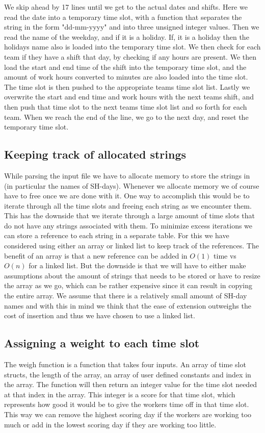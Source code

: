 We skip ahead by 17 lines until we get to the actual dates and shifts. Here we read the date into a temporary time slot, with a function that separates the string in the form "dd-mm-yyyy" and into three unsigned integer values. Then we read the name of the weekday, and if it is a holiday. If, it is a holiday then the holidays name also is loaded into the temporary time slot. We then check for each team if they have a shift that day, by checking if any hours are present. We then load the start and end time of the shift into the temporary time slot, and the amount of work hours converted to minutes are also loaded into the time slot. The time slot is then pushed to the appropriate teams time slot list. Lastly we overwrite the start and end time and work hours with the next teams shift, and then push that time slot to the next teams time slot list and so forth for each team. When we reach the end of the line, we go to the next day, and reset the temporary time slot. 

\subsection{Keeping track of allocated strings}
While parsing the input file we have to allocate memory to store the strings in (in particular the names of SH-days). Whenever we allocate memory we of course have to free once we are done with it. One way to accomplish this would be to iterate through all the time slots and freeing each string as we encounter them. This has the downside that we iterate through a large amount of time slots that do not have any strings associated with them. To minimize excess iterations we can store a reference to each string in a separate table. For this we have considered using either an  array or linked list to keep track of the references. The benefit of an array is that a new reference can be added in $O(1)$ time vs $O(n)$ for a linked list. But the downside is that we will have to either make assumptions about the amount of strings that needs to be stored or have to resize the array as we go, which can be rather expensive since it can result in copying the entire array. We assume that there is a relatively small amount of SH-day names and with this in mind we think that the ease of extension outweighs the cost of insertion and thus we have chosen to use a linked list.

\subsection{Assigning a weight to each time slot}
The weigh function is a function that takes four inputs. An array of time slot structs, the length of the array, an array of user defined constants and index in the array. The function will then return an integer value for the time slot needed at that index in the array. This integer is a score for that time slot, which represents how good it would be to give the workers time off in that time slot. This way we can remove the highest scoring day if the workers are working too much or add in the lowest scoring day if they are working too little. 

